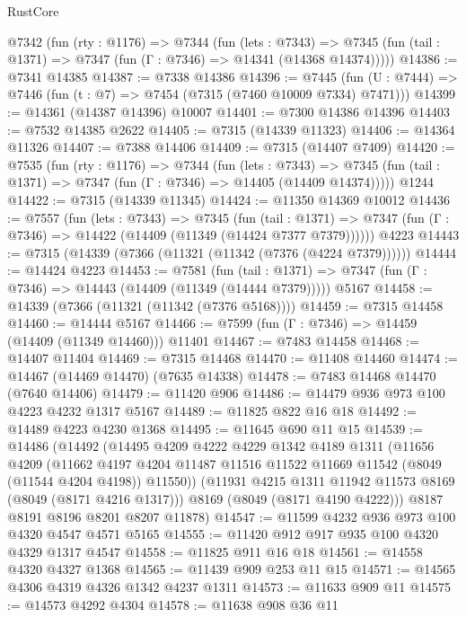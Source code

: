 \begin{lexlean}{RustCore}
\begin{coremodule}
  @7342
    (fun (rty : @1176) =>
    @7344
      (fun (lets : @7343) =>
      @7345 (fun (tail : @1371) => @7347 (fun (Γ : @7346) => @14341 (@14368 @14374)))))
@14386 := @7341 @14385
@14387 := @7338 @14386
@14396 := @7445
    (fun (U : @7444) => @7446 (fun (t : @7) => @7454 (@7315 (@7460 @10009 @7334) @7471)))
@14399 := @14361 (@14387 @14396) @10007
@14401 := @7300 @14386 @14396
@14403 := @7532 @14385 @2622
@14405 := @7315 (@14339 @11323)
@14406 := @14364 @11326
@14407 := @7388 @14406
@14409 := @7315 (@14407 @7409)
@14420 := @7535
    (fun (rty : @1176) =>
    @7344
      (fun (lets : @7343) =>
      @7345 (fun (tail : @1371) => @7347 (fun (Γ : @7346) => @14405 (@14409 @14374)))))
    @1244
@14422 := @7315 (@14339 @11345)
@14424 := @11350 @14369 @10012
@14436 := @7557
    (fun (lets : @7343) =>
    @7345
      (fun (tail : @1371) =>
      @7347 (fun (Γ : @7346) => @14422 (@14409 (@11349 (@14424 @7377 @7379))))))
    @4223
@14443 := @7315 (@14339 (@7366 (@11321 (@11342 (@7376 (@4224 @7379))))))
@14444 := @14424 @4223
@14453 := @7581
    (fun (tail : @1371) => @7347 (fun (Γ : @7346) => @14443 (@14409 (@11349 (@14444 @7379)))))
    @5167
@14458 := @14339 (@7366 (@11321 (@11342 (@7376 @5168))))
@14459 := @7315 @14458
@14460 := @14444 @5167
@14466 := @7599 (fun (Γ : @7346) => @14459 (@14409 (@11349 @14460))) @11401
@14467 := @7483 @14458
@14468 := @14407 @11404
@14469 := @7315 @14468
@14470 := @11408 @14460
@14474 := @14467 (@14469 @14470) (@7635 @14338)
@14478 := @7483 @14468 @14470 (@7640 @14406)
@14479 := @11420 @906
@14486 := @14479 @936 @973 @100 @4223 @4232 @1317 @5167
@14489 := @11825 @822 @16 @18
@14492 := @14489 @4223 @4230 @1368
@14495 := @11645 @690 @11 @15
@14539 := @14486
    (@14492
      (@14495
        @4209
        @4222
        @4229
        @1342
        @4189
        @1311
        (@11656
          @4209
          (@11662
            @4197
            @4204
            @11487
            @11516
            @11522
            @11669
            @11542
            (@8049 (@11544 @4204 @4198))
            @11550))
        (@11931 @4215 @1311 @11942 @11573 @8169 (@8049 (@8171 @4216 @1317)))
        @8169
        (@8049 (@8171 @4190 @4222)))
      @8187
      @8191
      @8196
      @8201
      @8207
      @11878)
@14547 := @11599 @4232 @936 @973 @100 @4320 @4547 @4571 @5165
@14555 := @11420 @912 @917 @935 @100 @4320 @4329 @1317 @4547
@14558 := @11825 @911 @16 @18
@14561 := @14558 @4320 @4327 @1368
@14565 := @11439 @909 @253 @11 @15
@14571 := @14565 @4306 @4319 @4326 @1342 @4237 @1311
@14573 := @11633 @909 @11
@14575 := @14573 @4292 @4304
@14578 := @11638 @908 @36 @11

\end{coremodule}
\end{lexlean}
